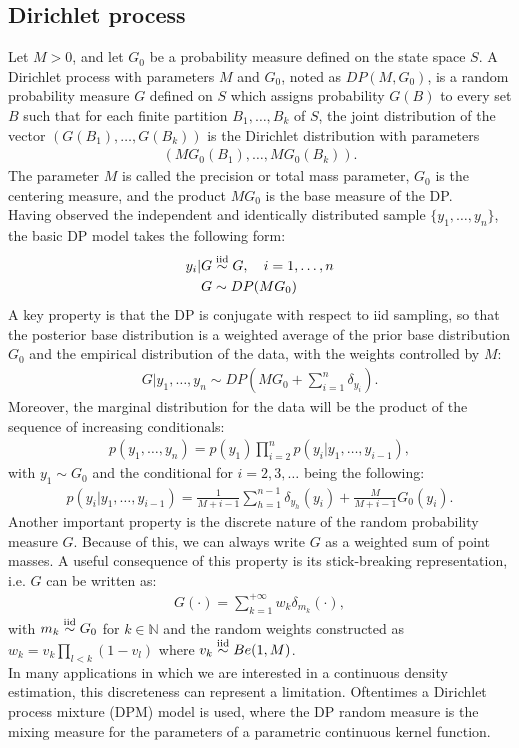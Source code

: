 \subsection{Dirichlet process}
Let $M>0$, and let $G_0$ be a probability measure defined on the state space $S$.
A Dirichlet process with parameters $M$ and $G_0$, noted as $DP(M,G_0)$, is a random probability measure $G$ defined on $S$ which assigns probability $G(B)$ to every set $B$ such that for each finite partition ${B_1,\dots,B_k}$ of $S$, the joint distribution of the  vector $(G(B_1),\dots,G(B_k))$ is the Dirichlet distribution with parameters
\begin{align*}
(MG_0(B_1),\dots,MG_0(B_k)).
\end{align*}
The parameter $M$ is called the precision or total mass parameter, $G_0$ is the centering measure, and the product $MG_0$ is the base measure of the DP. \\
Having observed the independent and identically distributed sample $\{y_1,\dots,y_n\}$, the basic DP model takes the following form:
\begin{equation}
	\begin{aligned}
	y_i | G &\stackrel{\text{iid}}{\sim} G, \quad i=1,\dots,n \\
	G &\sim DP(MG_0)
	\end{aligned}
\end{equation}
A key property is that the DP is conjugate with respect to iid sampling, so that the posterior base distribution is a weighted average of the prior base distribution $G_0$ and the empirical distribution of the data, with the weights controlled by $M$:
\begin{align}
	G | y_1,\dots,y_n \sim DP\left(M G_0 + \sum_{i=1}^n \delta_{y_i}\right).
\end{align}
Moreover, the marginal distribution for the data will be the product of the sequence of increasing conditionals:
\begin{align*}
	p(y_1,\dots,y_n)= p(y_1)\prod\limits_{i=2}^{n} p(y_i|y_1,\dots,y_{i-1}),
\end{align*}
with $y_1 \sim G_0$ and the conditional for $i=2,3,\dots$ being the following:
\begin{align*}
	p(y_i|y_1,\dots,y_{i-1})= \frac{1}{M+i-1}\sum_{h=1}^{n-1} \delta_{y_h}(y_i) +\frac{M}{M+i-1} G_0(y_i).
\end{align*}
Another important property is the discrete nature of the random probability measure $G$.
Because of this, we can always write $G$ as a weighted sum of point masses.
A useful consequence of this property is its stick-breaking representation, i.e. $G$ can be written as:
\begin{align*}
	G(\cdot) = \sum_{k=1}^{+\infty} w_k \delta_{m_k} (\cdot),
\end{align*}
with $m_k \stackrel{\text{iid}}{\sim} G_0$ for $k\in\mathbb{N}$ and the random weights constructed as $w_k =v_k\prod\limits_{l<k} (1-v_l)$ where $v_k \stackrel{\text{iid}}{\sim} Be(1,M)$. \\
In many applications in which we are interested in a continuous density estimation, this discreteness can represent a limitation.
Oftentimes a Dirichlet process mixture (DPM) model is used, where the DP random measure is the mixing measure for the parameters of a parametric continuous kernel function.

